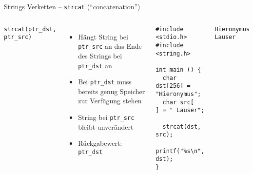 
\begin{frame}[fragile]{Strings Verketten -- \texttt{strcat} (\enquote{concatenation})}
%
\begin{columns}[T]
\begin{codebox}[Syntax]
\footnotesize\texttt{strcat(ptr\_dst, ptr\_src)}
\end{codebox}
%
\begin{itemize}
\item Hängt String bei \texttt{ptr\_src} an das Ende des Strings bei \texttt{ptr\_dst} an
\item Bei \texttt{ptr\_dst} muss bereits genug Speicher zur Verfügung stehen
\item String bei \texttt{ptr\_src} bleibt unverändert
\item Rückgabewert: \texttt{ptr\_dst}
\end{itemize}
%
\begin{codebox}[Beispiel]
\begin{verbatim}
#include <stdio.h>
#include <string.h>

int main () {
  char dst[256] = "Hieronymus";
  char src[   ] = " Lauser";

  strcat(dst, src);
  printf("%s\n", dst);
}
\end{verbatim}
\end{codebox}
%
\begin{cmdbox}[Ausgabe]
\scriptsize\texttt{Hieronymus Lauser}
\end{cmdbox}
%
\end{columns}
%
\end{frame}


